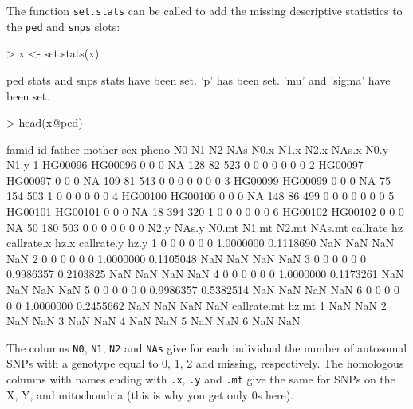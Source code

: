 \documentclass{article}
\renewenvironment{Schunk}{\vspace{\topsep}}{\vspace{\topsep}}
\begin{document}
  The function \verb!set.stats! can be called to add the missing descriptive statistics to the \verb!ped! 
  and \verb!snps! slots:
\begin{Schunk}
\begin{Sinput}
> x <- set.stats(x)
\end{Sinput}
\begin{Soutput}
ped stats and snps stats have been set. 
'p' has been set. 
'mu' and 'sigma' have been set.
\end{Soutput}
\begin{Sinput}
> head(x@ped)
\end{Sinput}
\begin{Soutput}
    famid      id father mother sex pheno  N0  N1  N2 NAs N0.x N1.x N2.x NAs.x N0.y N1.y
1 HG00096 HG00096      0      0   0    NA 128  82 523   0    0    0    0     0    0    0
2 HG00097 HG00097      0      0   0    NA 109  81 543   0    0    0    0     0    0    0
3 HG00099 HG00099      0      0   0    NA  75 154 503   1    0    0    0     0    0    0
4 HG00100 HG00100      0      0   0    NA 148  86 499   0    0    0    0     0    0    0
5 HG00101 HG00101      0      0   0    NA  18 394 320   1    0    0    0     0    0    0
6 HG00102 HG00102      0      0   0    NA  50 180 503   0    0    0    0     0    0    0
  N2.y NAs.y N0.mt N1.mt N2.mt NAs.mt  callrate        hz callrate.x hz.x callrate.y hz.y
1    0     0     0     0     0      0 1.0000000 0.1118690        NaN  NaN        NaN  NaN
2    0     0     0     0     0      0 1.0000000 0.1105048        NaN  NaN        NaN  NaN
3    0     0     0     0     0      0 0.9986357 0.2103825        NaN  NaN        NaN  NaN
4    0     0     0     0     0      0 1.0000000 0.1173261        NaN  NaN        NaN  NaN
5    0     0     0     0     0      0 0.9986357 0.5382514        NaN  NaN        NaN  NaN
6    0     0     0     0     0      0 1.0000000 0.2455662        NaN  NaN        NaN  NaN
  callrate.mt hz.mt
1         NaN   NaN
2         NaN   NaN
3         NaN   NaN
4         NaN   NaN
5         NaN   NaN
6         NaN   NaN
\end{Soutput}
\end{Schunk}

The columns \verb!N0!, \verb!N1!, \verb!N2! and \verb!NAs! give for each individual the number of
autosomal SNPs with a genotype equal to 0, 1, 2 and missing, respectively. The homologous columns
with names ending with \verb!.x!, \verb!.y! and \verb!.mt! give the same for SNPs on the X, Y, and mitochondria
(this is why you get only 0s here).
\end{document}
